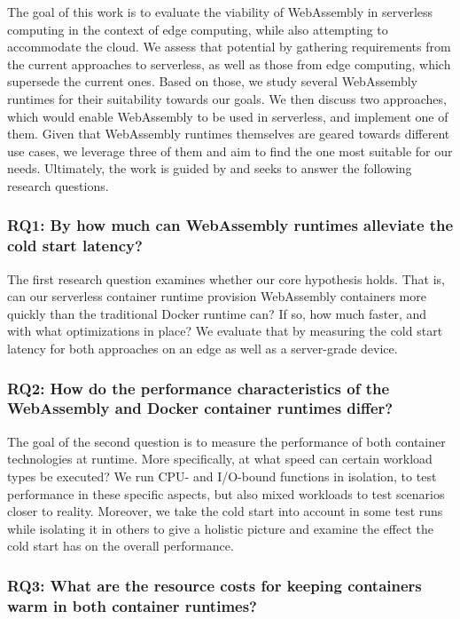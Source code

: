 The goal of this work is to evaluate the viability of WebAssembly in serverless computing in the context of edge computing, while also attempting to accommodate the cloud. We assess that potential by gathering requirements from the current approaches to serverless, as well as those from edge computing, which supersede the current ones. Based on those, we study several WebAssembly runtimes for their suitability towards our goals. We then discuss two approaches, which would enable WebAssembly to be used in serverless, and implement one of them. Given that WebAssembly runtimes themselves are geared towards different use cases, we leverage three of them and aim to find the one most suitable for our needs. Ultimately, the work is guided by and seeks to answer the following research questions.

\subsubsection*{RQ1: By how much can WebAssembly runtimes alleviate the cold start latency?}

The first research question examines whether our core hypothesis holds. That is, can our serverless container runtime provision WebAssembly containers more quickly than the traditional Docker runtime can? If so, how much faster, and with what optimizations in place? We evaluate that by measuring the cold start latency for both approaches on an edge as well as a server-grade device.

\subsubsection*{RQ2: How do the performance characteristics of the WebAssembly and Docker container runtimes differ?}

The goal of the second question is to measure the performance of both container technologies at runtime. More specifically, at what speed can certain workload types be executed? We run CPU- and I/O-bound functions in isolation, to test performance in these specific aspects, but also mixed workloads to test scenarios closer to reality. Moreover, we take the cold start into account in some test runs while isolating it in others to give a holistic picture and examine the effect the cold start has on the overall performance.

\subsubsection*{RQ3: What are the resource costs for keeping containers warm in both container runtimes?}

